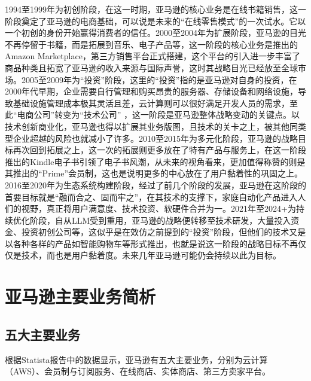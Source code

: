 \documentclass[12pt]{ctexart}
\begin{document}
1994至1999年为初创阶段，在这一时期，亚马逊的核心业务是在线书籍销售，这一阶段奠定了亚马逊的电商基础，可以说是未来的“在线零售模式”的一次试水。它以一个初创的身份开始赢得消费者的信任。2000至2004年为扩展阶段，亚马逊的目光不再停留于书籍，而是拓展到音乐、电子产品等，这一阶段的核心业务是推出的Amazon Marketplace，第三方销售平台正式搭建，这个平台的引入进一步丰富了商品种类且拓宽了亚马逊的收入来源与国际声誉，这时其战略目光已经放至全球市场。2005至2009年为“投资”阶段，这里的“投资”指的是亚马逊对自身的投资，在2000年代早期，企业需要自行管理和购买昂贵的服务器、存储设备和网络设施，导致基础设施管理成本极其灵活且差，云计算则可以很好满足开发人员的需求，至此“电商公司”转变为“技术公司” ，这一阶段是亚马逊整体战略变动的关键点。以技术创新商业化，亚马逊也得以扩展其业务版图，且技术的关卡之上，被其他同类型企业超越的风险也就减小了许多。2010至2015年为多元化阶段，亚马逊的战略目标再次回到拓展之上，这一次的拓展则更多放在了特有产品与服务上，在这一阶段推出的Kindle电子书引领了电子书风潮，从未来的视角看来，更加值得称赞的则是其推出的“Prime”会员制，这也是说明更多的中心放在了用户黏着性的巩固之上。2016至2020年为生态系统构建阶段，经过了前几个阶段的发展，亚马逊在这阶段的首要目标就是“融而合之、固而牢之”，在其技术的支撑下，家庭自动化产品进入人们的视野，真正将用户满意度、技术投资、软硬件合并为一。2021年至2024+为持续优化阶段，自从LLM受到重用，亚马逊的战略便转移至技术研发，大量投入资金、投资初创公司等，这似乎是在效仿之前提到的“投资”阶段，但他们的技术又是以各种各样的产品如智能购物车等形式推出，也就是说这一阶段的战略目标不再仅仅是技术，而也是用户黏着度。未来几年亚马逊可能仍会持续以此为目标。




\section{亚马逊主要业务简析}

\subsection{五大主要业务}
根据Statista报告中的数据显示\cite{16}，亚马逊有五大主要业务，分别为云计算（AWS）、会员制与订阅服务、在线商店、实体商店、第三方卖家平台。
\end{document}
